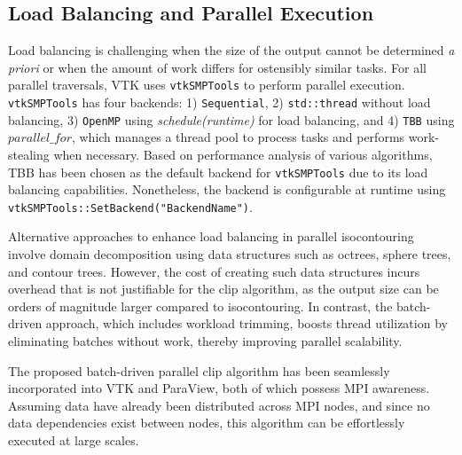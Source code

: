 \documentclass{egpubl}
\begin{document}
\subsection{Load Balancing and Parallel Execution}
\label{sec:load-balancing-and-parallel-execution}

Load balancing is challenging when the size of the output cannot be determined \textit{a priori} or when the amount of work differs for ostensibly similar tasks. For all parallel traversals, VTK uses \texttt{vtkSMPTools} to perform parallel execution. \texttt{vtkSMPTools} has four backends: 1) \texttt{Sequential}, 2) \texttt{std::thread} without load balancing, 3) \texttt{OpenMP} using \textit{schedule(runtime)} for load balancing, and 4) \texttt{TBB} \cite{TBB} using $parallel\_for$, which manages a thread pool to process tasks and performs work-stealing when necessary. Based on performance analysis of various algorithms, TBB has been chosen as the default backend for \texttt{vtkSMPTools} due to its load balancing capabilities. Nonetheless, the backend is configurable at runtime using \texttt{vtkSMPTools::SetBackend("BackendName")}.

Alternative approaches to enhance load balancing in parallel isocontouring involve domain decomposition using data structures such as octrees, sphere trees, and contour trees. However, the cost of creating such data structures incurs overhead that is not justifiable for the clip algorithm, as the output size can be orders of magnitude larger compared to isocontouring. In contrast, the batch-driven approach, which includes workload trimming, boosts thread utilization by eliminating batches without work, thereby improving parallel scalability.

The proposed batch-driven parallel clip algorithm has been seamlessly incorporated into VTK and ParaView, both of which possess MPI awareness. Assuming data have already been distributed across MPI nodes, and since no data dependencies exist between nodes, this algorithm can be effortlessly executed at large scales. 

\end{document}
